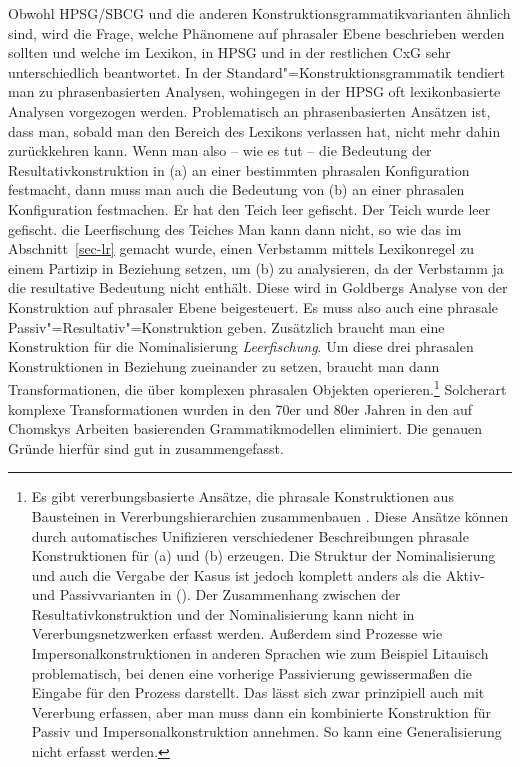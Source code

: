 Obwohl HPSG/SBCG und die anderen Konstruktionsgrammatikvarianten ähnlich sind, wird die Frage, welche Phänomene auf phrasaler Ebene
beschrieben werden sollten und welche im Lexikon, in HPSG und in der restlichen CxG sehr unterschiedlich
beantwortet. In der Standard"=Konstruktionsgrammatik tendiert man zu phrasenbasierten Analysen, wohingegen in
der HPSG oft lexikonbasierte Analysen vorgezogen werden. Problematisch an phrasenbasierten Ansätzen ist, 
dass man, sobald man den Bereich des Lexikons verlassen hat, nicht mehr
dahin zurückkehren kann. Wenn man also -- wie es \citet{Goldberg95a} tut -- die Bedeutung
der Resultativkonstruktion in (a) an einer bestimmten phrasalen Konfiguration festmacht,
dann muss man auch die Bedeutung von (b) an einer phrasalen Konfiguration festmachen.
\eal
\label{bsp-res-passiv}
\ex Er hat den Teich leer gefischt.
\ex Der Teich wurde leer gefischt.
\ex die Leerfischung des Teiches
\zl
Man kann dann nicht, so wie das im Abschnitt~\ref{sec-lr} gemacht wurde, einen Verbstamm
mittels Lexikonregel zu einem Partizip in Beziehung setzen, um (b) zu analysieren,
da der Verbstamm ja die resultative Bedeutung nicht enthält. Diese wird in Goldbergs Analyse
von der Konstruktion auf phrasaler Ebene beigesteuert. Es muss also auch eine phrasale
Passiv"=Resultativ"=Konstruktion geben. Zusätzlich braucht man eine Konstruktion für die
Nominalisierung \emph{Leerfischung}. Um diese drei phrasalen Konstruktionen in Beziehung
zueinander zu setzen, braucht man dann Transformationen, die über komplexen phrasalen
Objekten operieren.\footnote{
  Es gibt vererbungsbasierte Ansätze, die phrasale Konstruktionen aus Bausteinen in
  Vererbungshierarchien zusammenbauen \citep{LK2017a,Seyffarth2023a}. Diese Ansätze können durch automatisches Unifizieren
  verschiedener Beschreibungen phrasale Konstruktionen für (a) und (b) erzeugen. Die
  Struktur der Nominalisierung und auch die Vergabe der Kasus ist jedoch komplett anders als die
  Aktiv- und Passivvarianten in (). Der Zusammenhang zwischen der Resultativkonstruktion und
  der Nominalisierung kann nicht in Vererbungsnetzwerken erfasst werden. Außerdem sind Prozesse wie
  Impersonalkonstruktionen in anderen Sprachen wie zum Beispiel Litauisch problematisch, bei denen
  eine vorherige Passivierung gewissermaßen die Eingabe für den Prozess darstellt. Das lässt sich
  zwar prinzipiell auch mit Vererbung erfassen, aber man muss dann ein kombinierte Konstruktion für
  Passiv und Impersonalkonstruktion annehmen. So kann eine Generalisierung nicht erfasst werden.
} Solcherart komplexe Transformationen wurden in den 70er und 80er Jahren
in den auf Chomskys Arbeiten basierenden Grammatikmodellen
eliminiert. Die genauen Gründe hierfür sind gut in  zusammengefasst.

